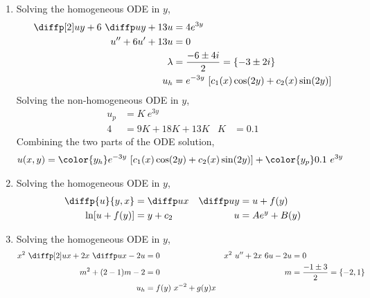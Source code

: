 \begin{enumerate}
    \item Solving the homogeneous ODE in $ y $,
          \begin{align}
              \diffp[2] uy + 6\ \diffp uy + 13u & = 4e^{3y}             \\
              u'' + 6u' + 13u                   & = 0                   \\
              \lambda                           & = \frac{-6 \pm 4i}{2}
              = \{-3 \pm 2i\}                                           \\
              u_h                               & = e^{-3y}\
              [c_1(x) \cos(2y) + c_2(x) \sin(2y)]
          \end{align}
          Solving the non-homogeneous ODE in $y$,
          \begin{align}
              u_p & = K\ e^{3y}        \\
              4   & = 9K + 18K + 13K &
              K   & = 0.1
          \end{align}
          Combining the two parts of the ODE solution,
          \begin{align}
              u(x, y) & = {\color{y_h} e^{-3y}\ [c_1(x) \cos(2y) + c_2(x) \sin(2y)]}
              + {\color{y_p} 0.1\ e^{3y}}
          \end{align}

    \item Solving the homogeneous ODE in $ y $,
          \begin{align}
              \diffp {u}{y, x} & = \diffp ux   &
              \diffp uy        & = u + f(y)      \\
              \ln[u + f(y)]    & = y + c_2     &
              u                & = Ae^y + B(y)
          \end{align}

    \item Solving the homogeneous ODE in $ y $,
          \begin{align}
              x^2\ \diffp[2] ux + 2x\ \diffp ux - 2u & = 0            &
              x^2\ u'' + 2x\ 6u - 2u                 & = 0              \\
              m^2 + (2-1)m - 2                       & = 0            &
              m                                      &
              = \frac{-1 \pm 3}{2} = \{-2, 1\}                          \\
              u_h                                    & = f(y)\ x^{-2}
              + g(y)x
          \end{align}


\end{enumerate}
